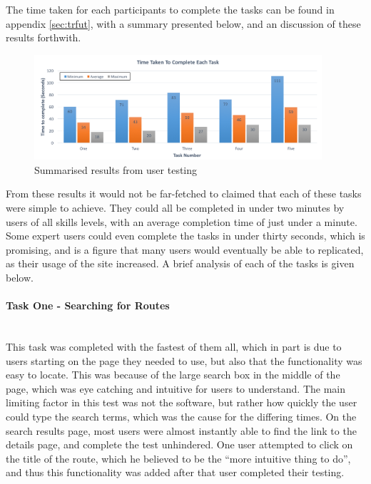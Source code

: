 \newpage
\noindent
The time taken for each participants to complete the tasks can be found in appendix \ref{sec:trfut}, with a summary presented below, and an discussion of these results forthwith.

\begin{figure}[!ht]
	\begin{center}
		\includegraphics[width=0.95\textwidth]{images/testing/results.png}
	\end{center}
	\vspace{-6mm}
	\caption{Summarised results from user testing}	
	\vspace{-1mm}
\end{figure}

\noindent
From these results it would not be far-fetched to claimed that each of these tasks were simple to achieve. They could all be completed in under two minutes by users of all skills levels, with an average completion time of just under a minute. Some expert users could even complete the tasks in under thirty seconds, which is promising, and is a figure that many users would eventually be able to replicated, as their usage of the site increased. A brief analysis of each of the tasks is given below.

\paragraph{Task One - Searching for Routes}\ \\
This task was completed with the fastest of them all, which in part is due to users starting on the page they needed to use, but also that the functionality was easy to locate. This was because of the large search box in the middle of the page, which was eye catching and intuitive for users to understand. The main limiting factor in this test was not the software, but rather how quickly the user could type the search terms, which was the cause for the differing times. On the search results page, most users were almost instantly able to find the link to the details page, and complete the test unhindered. One user attempted to click on the title of the route, which he believed to be the ``more intuitive thing to do'', and thus this functionality was added after that user completed their testing.

